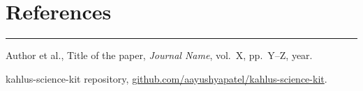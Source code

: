 \documentclass[11pt,letterpaper]{article}
\begin{document}
\section{References}
\rule{\textwidth}{0.4pt}
{\small
\begin{enumerate}[label={[\arabic*]},leftmargin=2em,itemsep=0pt]
  \item Author et al., Title of the paper, \textit{Journal Name}, vol.~X, pp.~Y--Z, year.
  \item kahlus-science-kit repository,
        \href{https://github.com/aayushyapatel/kahlus-science-kit}%
        {github.com/aayushyapatel/kahlus-science-kit}.
\end{enumerate}}
\end{document}
